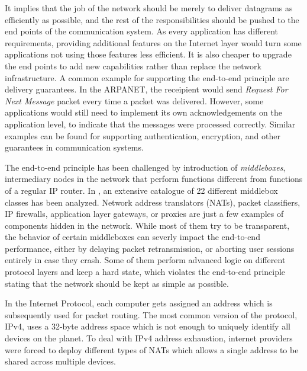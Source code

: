 It implies that the job of the network should be merely to deliver datagrams as efficiently as possible, and the rest of the responsibilities should be pushed to the end points of the communication system. As every application has different requirements, providing additional features on the Internet layer would turn some applications not using those features less efficient. It is also cheaper to upgrade the end points to add new capabilities rather than replace the network infrastructure. A common example for supporting the end-to-end principle are delivery guarantees. In the ARPANET, the receipient would send \textit{Request For Next Message} packet every time a packet was delivered. However, some applications would still need to implement its own acknowledgements on the application level, to indicate that the messages were processed correctly. Similar examples can be found for supporting authentication, encryption, and other guarantees in communication systems.

The end-to-end principle has been challenged by introduction of \textit{middleboxes}, intermediary nodes in the network that perform functions different from functions of a regular IP router. In \cite{rfc3234}, an extensive catalogue of 22 different middlebox classes has been analyzed. Network address translators (NATs), packet classifiers, IP firewalls, application layer gateways, or proxies are just a few examples of components hidden in the network. While most of them try to be transparent, the behavior of certain middleboxes can severly impact the end-to-end performance, either by delaying packet retransmission, or aborting user sessions entirely in case they crash. Some of them perform advanced logic on different protocol layers and keep a hard state, which violates the end-to-end principle stating that the network should be kept as simple as possible.


In the Internet Protocol, each computer gets assigned an address which is subsequently used for packet routing. The most common version of the protocol, IPv4, uses a 32-byte address space which is not enough to uniquely identify all devices on the planet. To deal with IPv4 address exhaustion, internet providers were forced to deploy different types of NATs which allows a single address to be shared across multiple devices.

